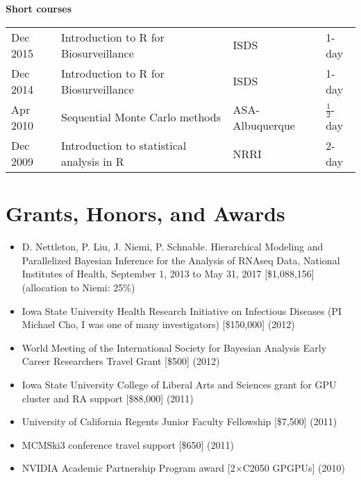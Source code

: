 \documentclass[overlapped,line]{res}
\newcommand{\sinceappt}{}
\begin{document}
\begin{resume}
\newpage

{\bf Short courses}

\begin{tabular}{llll}
Dec 2015 & Introduction to R for Biosurveillance & ISDS & 1-day \\
Dec 2014 & Introduction to R for Biosurveillance & ISDS & 1-day \\
Apr 2010 & Sequential Monte Carlo methods & ASA-Albuquerque & $\frac{1}{2}$-day \\
Dec 2009 & Introduction to statistical analysis in R & NRRI & 2-day
\end{tabular}



\section{\bf Grants, Honors, and Awards}

\begin{itemize}
\item D. Nettleton, P. Liu, J. Niemi, P. Schnable. Hierarchical Modeling and Parallelized Bayesian Inference for the Analysis of RNAseq Data, National Institutes of Health, September 1, 2013 to May 31, 2017 [\$1,088,156] (allocation to Niemi: 25\%)

\item Iowa State University Health Research Initiative on Infectious Diseases (PI Michael Cho, I was one of many investigators) [\$150,000] (2012)
\item World Meeting of the International Society for Bayesian Analysis Early Career Researchers Travel Grant [\$500] (2012)
\item Iowa State University College of Liberal Arts and Sciences grant for GPU cluster and RA support [\$88,000] (2011)

\sinceappt

\item University of California Regents Junior Faculty Fellowship [\$7,500] (2011)
\item MCMSki3 conference travel support [\$650] (2011)
\item NVIDIA Academic Partnership Program award [2$\times$C2050 GPGPUs] (2010)




\end{itemize}
\end{resume}
\end{document}
